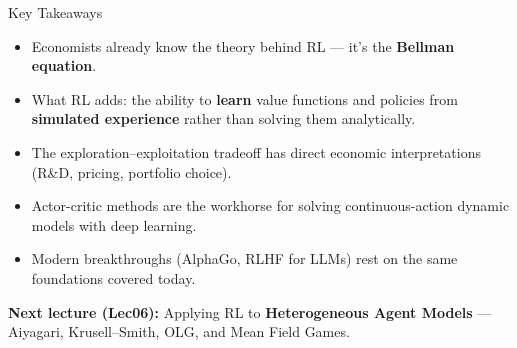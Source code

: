 \documentclass[10pt,english,aspectratio=169]{beamer}
\begin{document}
\begin{frame}{Key Takeaways}
\begin{itemize}
    \item Economists already know the theory behind RL --- it's the \textbf{Bellman equation}.
    \item What RL adds: the ability to \textbf{learn} value functions and policies from \textbf{simulated experience} rather than solving them analytically.
    \item The exploration--exploitation tradeoff has direct economic interpretations (R\&D, pricing, portfolio choice).
    \item Actor-critic methods are the workhorse for solving continuous-action dynamic models with deep learning.
    \item Modern breakthroughs (AlphaGo, RLHF for LLMs) rest on the same foundations covered today.
\end{itemize}

\vspace{0.5cm}
\textbf{Next lecture (Lec06):} Applying RL to \textbf{Heterogeneous Agent Models} --- Aiyagari, Krusell--Smith, OLG, and Mean Field Games.
\end{frame}
\end{document}
